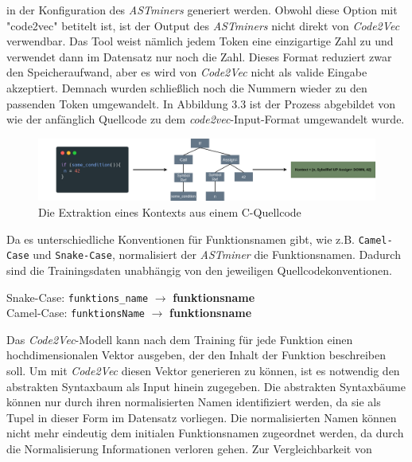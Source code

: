 \documentclass[12pt,letterpaper,ngerman]{article}
\begin{document}
in der Konfiguration des \textit{ASTminers} generiert werden.
Obwohl diese Option mit "code2vec" betitelt ist, ist der Output des
\textit{ASTminers} nicht direkt von \textit{Code2Vec} verwendbar.
Das Tool weist nämlich jedem Token eine
einzigartige Zahl zu und verwendet dann im Datensatz nur noch die Zahl.
Dieses Format reduziert zwar den Speicheraufwand, aber es wird von 
\textit{Code2Vec} nicht als valide Eingabe akzeptiert. Demnach
wurden schließlich noch die Nummern wieder zu den passenden
Token umgewandelt. In Abbildung 3.3 ist der Prozess abgebildet 
von wie der anfänglich Quellcode zu dem 
\textit{code2vec}-Input-Format
umgewandelt wurde.
\begin{figure}
  \begin{center}
    \includegraphics[scale=0.2]{abb/ast-extraction-example.drawio.png}
  \end{center}
  \caption{Die Extraktion eines Kontexts aus einem C-Quellcode}
\end{figure}
Da es unterschiedliche Konventionen für Funktionsnamen gibt, wie z.B.
\verb|Camel-Case| und \verb|Snake-Case|, normalisiert der \textit{ASTminer} 
die Funktionsnamen. Dadurch sind die Trainingsdaten unabhängig von den
jeweiligen Quellcodekonventionen.
\begin{example}
  \hfill
  \begin{center}
    Snake-Case: \verb|funktions_name| $\to$ {\bf funktions\text{\textbar}name }\\
    Camel-Case: \verb|funktionsName| $\to$ {\bf funktions\text{\textbar}name}
  \end{center}
\end{example}
Das \textit{Code2Vec}-Modell kann nach dem Training für jede 
Funktion einen hochdimensionalen
Vektor ausgeben, der den Inhalt der Funktion beschreiben soll.
Um mit \textit{Code2Vec} diesen Vektor generieren zu können, ist 
es notwendig den abstrakten Syntaxbaum als Input hinein zugegeben.
Die abstrakten Syntaxbäume können nur durch 
ihren normalisierten Namen identifiziert werden, da sie als Tupel 
in dieser Form im Datensatz vorliegen. Die normalisierten Namen
können nicht mehr 
eindeutig dem initialen Funktionsnamen zugeordnet werden, da durch die 
Normalisierung Informationen verloren gehen. Zur Vergleichbarkeit von 
\end{document}
